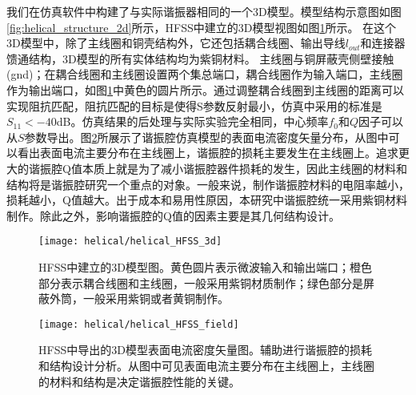我们在仿真软件中构建了与实际谐振器相同的一个3D模型。模型结构示意图如图\ref{fig:helical_structure_2d}所示，HFSS中建立的3D模型视图如图\ref{fig:helical_HFSS_3d}所示。
在这个3D模型中，除了主线圈和铜壳结构外，它还包括耦合线圈、输出导线$l_{out}$和连接器馈通结构，3D模型的所有实体结构均为紫铜材料。
主线圈与铜屏蔽壳侧壁接触(gnd)；在耦合线圈和主线圈设置两个集总端口，耦合线圈作为输入端口，主线圈作为输出端口，如图\ref{fig:helical_HFSS_3d}中黄色的圆片所示。通过调整耦合线圈到主线圈的距离可以实现阻抗匹配，阻抗匹配的目标是使得S参数反射最小，仿真中采用的标准是$S_{11}<-40$dB。仿真结果的后处理与实际实验完全相同，中心频率$f_0$和$Q$因子可以从$S$参数导出。图\ref{fig:helical_HFSS_field}所展示了谐振腔仿真模型的表面电流密度矢量分布，从图中可以看出表面电流主要分布在主线圈上，谐振腔的损耗主要发生在主线圈上。追求更大的谐振腔Q值本质上就是为了减小谐振腔器件损耗的发生，因此主线圈的材料和结构将是谐振腔研究一个重点的对象。一般来说，制作谐振腔材料的电阻率越小，损耗越小，Q值越大。出于成本和易用性原因，本研究中谐振腔统一采用紫铜材料制作。除此之外，影响谐振腔的Q值的因素主要是其几何结构设计。

\begin{figure}
    \centering
    \caption[HFSS中建立的3D模型图]{HFSS中建立的3D模型图。黄色圆片表示微波输入和输出端口；橙色部分表示耦合线圈和主线圈，一般采用紫铜材质制作；绿色部分是屏蔽外筒，一般采用紫铜或者黄铜制作。\label{fig:helical_HFSS_3d}}
    \texttt{[image: helical/helical\_HFSS\_3d]}
\end{figure}

\begin{figure}
    \centering
    \caption[HFSS中导出的3D模型表面电流密度矢量图]{HFSS中导出的3D模型表面电流密度矢量图。辅助进行谐振腔的损耗和结构设计分析。从图中可见表面电流主要分布在主线圈上，主线圈的材料和结构是决定谐振腔性能的关键。\label{fig:helical_HFSS_field}}
    \texttt{[image: helical/helical\_HFSS\_field]}
\end{figure}

